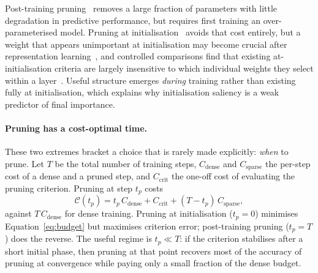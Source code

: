 \documentclass{article}
\theoremstyle{definition}
\theoremstyle{remark}
\begin{document}
Post-training pruning~\cite{lecun1990obd, hassibi1993obs, han2015learning}
removes a large fraction of parameters with little degradation in predictive
performance, but requires first training an over-parameterised model. Pruning
at initialisation~\cite{lee2019snip, wang2020grasp, tanaka2020synflow,
wang2023ntksap} avoids that cost entirely, but a weight that appears
unimportant at initialisation may become crucial after representation
learning~\cite{frankle2020earlyphase}, and controlled comparisons find that
existing at-initialisation criteria are largely insensitive to which individual
weights they select within a layer~\cite{frankle2021missing, su2020sanity}.
Useful structure emerges \emph{during} training rather than existing fully at
initialisation, which explains why initialisation saliency is a weak predictor
of final importance.

\paragraph{Pruning has a cost-optimal time.} These two extremes bracket a
choice that is rarely made explicitly: \emph{when} to prune. Let $T$ be the
total number of training steps, $C_{\mathrm{dense}}$ and $C_{\mathrm{sparse}}$
the per-step cost of a dense and a pruned step, and $C_{\mathrm{crit}}$ the
one-off cost of evaluating the pruning criterion. Pruning at step $t_p$ costs
\begin{equation}
    \mathcal C(t_p)
    =
    t_p\,C_{\mathrm{dense}}
    +
    C_{\mathrm{crit}}
    +
    (T-t_p)\,C_{\mathrm{sparse}},
    \label{eq:budget}
\end{equation}
against $T\,C_{\mathrm{dense}}$ for dense training. Pruning at initialisation
($t_p=0$) minimises Equation~\eqref{eq:budget} but maximises criterion error;
post-training pruning ($t_p=T$) does the reverse. The useful regime is
$t_p \ll T$: if the criterion stabilises after a short initial phase, then
pruning at that point recovers most of the accuracy of pruning at convergence
while paying only a small fraction of the dense budget.
\end{document}
